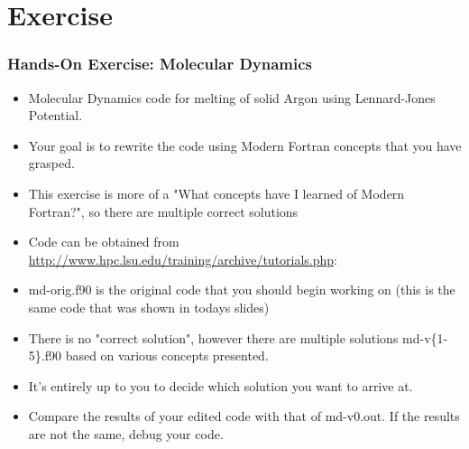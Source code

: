 \documentclass[10pt,t]{beamer}
\begin{document}
\section{Exercise}
\begin{frame}
  \frametitle{\small Hands-On Exercise: Molecular Dynamics}
  \begin{itemize}
    \item Molecular Dynamics code for melting of solid Argon using Lennard-Jones Potential.
    \item Your goal is to rewrite the code using Modern Fortran concepts that you have grasped.
    \item This exercise is more of a "What concepts have I learned of Modern Fortran?", so there are multiple correct solutions
    \item Code can be obtained from \url{http://www.hpc.lsu.edu/training/archive/tutorials.php}:
    \item md-orig.f90 is the original code that you should begin working on (this is the same code that was shown in todays slides)
    \item There is no "correct solution", however there are multiple solutions md-v\{1-5\}.f90 based on various concepts presented.
    \item It's entirely up to you to decide which solution you want to arrive at.
    \item Compare the results of your edited code with that of md-v0.out. If the results are not the same, debug your code.
  \end{itemize}
\end{frame}
\end{document}
